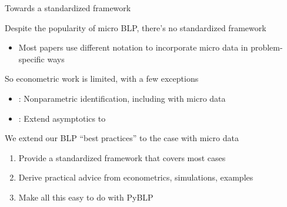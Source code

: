 \documentclass[aspectratio=169,10pt]{beamer}
\begin{document}
\begin{frame}{Towards a standardized framework}
    \begin{wideitemize}
        \item Despite the popularity of micro BLP, there's \alert{no standardized framework}
        \begin{itemize}
            \item Most papers use different notation to incorporate micro data in problem-specific ways
        \end{itemize}
                \item So econometric work is limited, with a few exceptions
        \begin{itemize}
            \item \cite{berry2014identification,berry2022nonparametric}: Nonparametric identification, including with micro data
            \item \cite{myojo2012asymptotic}: Extend \cite{berry2004limit} asymptotics to \cite{petrin2002quantifying}
        \end{itemize}
                \item We extend our BLP ``best practices'' \citep{conlon2020best} to the case with micro data
        \begin{enumerate}
            \item Provide a \alert{standardized framework} that covers most cases
            \item Derive \alert{practical advice} from econometrics, simulations, examples
            \item Make all this easy to do with \alert{PyBLP}
        \end{enumerate}
    \end{wideitemize}
\end{frame}
\end{document}
